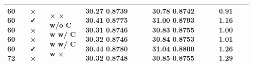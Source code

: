 \begin{tabular}{llllll}
\toprule
60 60 60 60 60 72 & × ✓ × × ✓ × & × × w/o C w w/ C w w/ C w × & 30.27 0.8739 30.41 0.8775 30.31 0.8746 30.32 0.8746 30.44 0.8780 30.32 0.8748 & 30.78 0.8742 31.00 0.8793 30.83 0.8755 30.84 0.8753 31.04 0.8800 30.85 0.8755 & 0.91 1.16 1.00 1.01 1.26 1.29 \\
\midrule
\bottomrule
\end{tabular}
